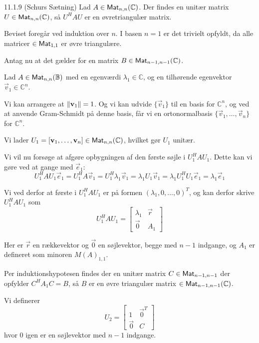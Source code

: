 \begin{saetning}{11.1.9 (Schurs Sætning)}
	Lad $A\in \textsf{Mat}_{n,n}(\mathbb{C})$. Der findes en unitær matrix $U\in \textsf{Mat}_{
	n,n}(\mathbb{C})$, så $U^HAU$ er en øvretriangulær matrix.
\end{saetning}

\begin{bevis}
	\setlength{\parindent}{0cm}
	Beviset foregår ved induktion over $n$. I basen $n=1$ er det trivielt
	opfyldt, da alle matricer $\in \textsf{Mat}_{1,1}$ er øvre triangulære.
	
	\noindent
	Antag nu at det gælder for en matrix $B \in \textsf{Mat}_{n-1,n-1}(\mathbb{C})$.
	
	Lad $A\in \textsf{Mat}_{n,n}(\mathbb{B})$ med en egenværdi $\lambda_1 \in
	\mathbb{C}$, og en tilhørende egenvektor $\vec{v}_1 \in \mathbb{C}^n$.

	Vi kan arrangere at $\lVert\mathbf{v}_1\rVert = 1$. Og vi kan udvide
	$\{\vec{v}_1\}$ til en basis for $\mathbb{C}^n$, og ved at anvende
	Gram-Schmidt på denne basis, får vi en ortonormalbasis $\{\vec{v}_1, \dotsc
	,\vec{v}_n\}$ for $\mathbb{C}^n$.

	Vi lader $U_1 = [\mathbf{v}_1, \dotsc, \mathbf{v}_n] \in \textsf{Mat}_{n,n}(\mathbb{C})$,
	hvilket gør $U_1$ unitær.

	Vi vil nu forsøge at afgøre opbygningen af den første søjle i $U_1^HAU_1$.
	Dette kan vi gøre ved at gange med $\vec{e}_1$:
	\[
		U_1^HAU_1\vec{e}_1
		= U_1^HA\vec{v}_1
		= U_1^H\lambda_1\vec{v}_1
		= \lambda_1U_1\vec{v}_1
		= \lambda_1U_1^HU_1\vec{e}_1
		= \lambda_1\vec{e}_1
	\]

	Vi ved derfor at første i $U_1^HAU_1$ er på formen $(\lambda_1, 0,
	\dotsc,0)^T$, og kan derfor skrive $U_1^HAU_1$ som
	\[
		U_1^HAU_1 = \begin{bmatrix}
			\lambda_1 & \vec{r}\\
			\vec{0}   & A_1
		\end{bmatrix}
	\]

	Her er $\vec{r}$ en rækkevektor og $\vec{0}$ en søjlevektor, begge med
	$n-1$ indgange, og $A_1$ er defineret som minoren $M(A)_{1,1}$.
	
	Per induktionshypotesen findes der en unitær matrix $C \in \textsf{Mat}_{n-1,n-1}$
	der opfylder $C^HA_1C=B$, så $B$ er en øvre triangulær matrix $\in
	\textsf{Mat}_{n-1,n-1}(\mathbb{C})$.

	Vi definerer
	\[
		U_2 = \begin{bmatrix}
			1       & \vec{0}^T\\
			\vec{0} & C
		\end{bmatrix}
	\]
	hvor $0$ igen er en søjlevektor med $n-1$ indgange.


\end{bevis}
